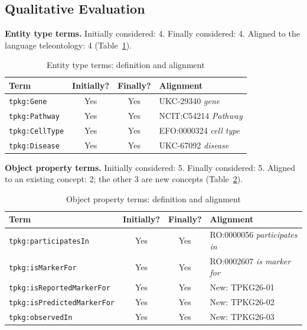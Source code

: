 \subsection{Qualitative Evaluation}

\noindent\textbf{Entity type terms.} Initially considered: 4. Finally considered: 4. Aligned to the language teleontology: 4 (Table~\ref{tab:eval-etypes}).

\begin{table}[htbp]
\centering
\small
\begin{tabularx}{\linewidth}{|l|c|c|X|}
\hline
\textbf{Term} & \textbf{Initially?} & \textbf{Finally?} & \textbf{Alignment} \\ \hline
\texttt{tpkg:Gene} & Yes & Yes & UKC-29340 \emph{gene} \\ \hline
\texttt{tpkg:Pathway} & Yes & Yes & NCIT:C54214 \emph{Pathway} \\ \hline
\texttt{tpkg:CellType} & Yes & Yes & EFO:0000324 \emph{cell type} \\ \hline
\texttt{tpkg:Disease} & Yes & Yes & UKC-67092 \emph{disease} \\ \hline
\end{tabularx}
\caption{Entity type terms: definition and alignment}
\label{tab:eval-etypes}
\end{table}

\noindent\textbf{Object property terms.} Initially considered: 5. Finally considered: 5. Aligned to an existing concept: 2; the other 3 are new concepts (Table~\ref{tab:eval-oprops}).

\begin{table}[htbp]
\centering
\small
\begin{tabularx}{\linewidth}{|l|c|c|X|}
\hline
\textbf{Term} & \textbf{Initially?} & \textbf{Finally?} & \textbf{Alignment} \\ \hline
\texttt{tpkg:participatesIn} & Yes & Yes & RO:0000056 \emph{participates in} \\ \hline
\texttt{tpkg:isMarkerFor} & Yes & Yes & RO:0002607 \emph{is marker for} \\ \hline
\texttt{tpkg:isReportedMarkerFor} & Yes & Yes & New: TPKG26-01 \\ \hline
\texttt{tpkg:isPredictedMarkerFor} & Yes & Yes & New: TPKG26-02 \\ \hline
\texttt{tpkg:observedIn} & Yes & Yes & New: TPKG26-03 \\ \hline
\end{tabularx}
\caption{Object property terms: definition and alignment}
\label{tab:eval-oprops}
\end{table}

